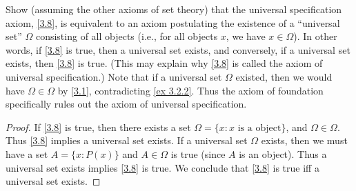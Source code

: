 \begin{exercise}\label{ex 3.2.3}
  Show (assuming the other axioms of set theory) that the universal specification axiom, \cref{3.8}, is equivalent to an axiom postulating the existence of a ``universal set'' \(\Omega\) consisting of all objects (i.e., for all objects \(x\), we have \(x \in \Omega\)).
  In other words, if \cref{3.8} is true, then a universal set exists, and conversely, if a universal set exists, then \cref{3.8} is true.
  (This may explain why \cref{3.8} is called the axiom of universal specification.)
  Note that if a universal set \(\Omega\) existed, then we would have \(\Omega \in \Omega\) by \cref{3.1}, contradicting \cref{ex 3.2.2}.
  Thus the axiom of foundation specifically rules out the axiom of universal specification.
\end{exercise}

\begin{proof}
  If \cref{3.8} is true, then there exists a set \(\Omega = \{x: x \text{ is a object}\}\), and \(\Omega \in \Omega\).
  Thus \cref{3.8} implies a universal set exists.
  If a universal set \(\Omega\) exists, then we must have a set \(A = \{x: P(x)\}\) and \(A \in \Omega\) is true (since \(A\) is an object).
  Thus a universal set exists implies \cref{3.8} is true.
  We conclude that \cref{3.8} is true iff a universal set exists.
\end{proof}